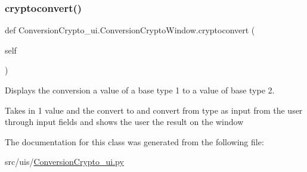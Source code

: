 \subsubsection{\texorpdfstring{cryptoconvert()}{cryptoconvert()}}
{\footnotesize\ttfamily def Conversion\+Crypto\+\_\+ui.\+Conversion\+Crypto\+Window.\+cryptoconvert (\begin{DoxyParamCaption}\item[{}]{self }\end{DoxyParamCaption})}



Displays the conversion a value of a base type 1 to a value of base type 2. 

Takes in 1 value and the convert to and convert from type as input from the user through input fields and shows the user the result on the window 

The documentation for this class was generated from the following file\+:\begin{DoxyCompactItemize}
\item 
src/uis/\hyperlink{_conversion_crypto__ui_8py}{Conversion\+Crypto\+\_\+ui.\+py}\end{DoxyCompactItemize}
